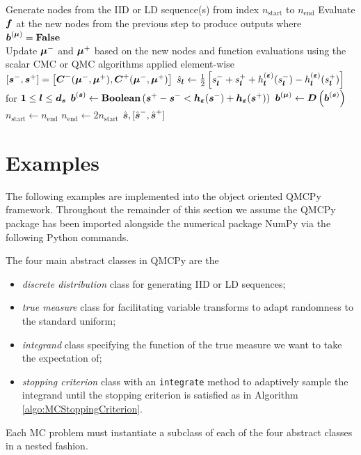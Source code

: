 \documentclass{article}[12pt]
\begin{document}
\begin{algorithm}[h!]
\begin{algorithmic}
     
        \State Generate nodes from the IID or LD sequence(s) from index $n_\text{start}$ to $n_\text{end}$
        \State Evaluate $\bf$ at the new nodes from the previous step to produce outputs where $\bb^{(\bmu)}=\textbf{\False}$ \\ 
        \State Update $\bmu^-$ and $\bmu^+$ based on the new nodes and function evaluations using the scalar CMC or QMC algorithms applied element-wise 
        \State $[\bs^-,\bs^+] = \left[\bC^-(\bmu^-,\bmu^+),\bC^+(\bmu^-,\bmu^+)\right]$ 
        \State $\hat{s}_{\bl} \gets \frac{1}{2}\left[s_{\bl}^-+s_{\bl}^++h^{(\bvarepsilon)}_{\bl}(s_{\bl}^-)-h^{(\bvarepsilon)}_{\bl}(s_{\bl}^+)\right]$ for $\boldsymbol{1} \leq \bl \leq \bd_{\bs}$ 
        \State $\bb^{(\bs)} \gets \textbf{Boolean}\left(\bs^+-\bs^- < \bh_{\bvarepsilon}(\bs^-)+\bh_{\bvarepsilon}(\bs^+)\right)$ 
        \State $\bb^{(\bmu)} \gets \bD\left(\bb^{(\bs)}\right)$
        \State $n_\text{start} \gets n_\text{end}$
        \State $n_\text{end} \gets 2n_\text{start}$
    \EndWhile
    \State \Return $\hat{\bs},[\hat{\bs}^-,\hat{\bs}^+]$
    \end{algorithmic}
\end{algorithm}

\section{Examples} \label{sec:examples}

The following examples are implemented into the object oriented QMCPy framework. Throughout the remainder of this section we assume the QMCPy package \cite{QMCPy} has been imported alongside the numerical package NumPy \cite{numpy} via the following Python commands. 

The four main abstract classes in QMCPy are the 
\begin{itemize}
    \item \emph{discrete distribution} class for generating IID or LD sequences;
    \item \emph{true measure} class for facilitating variable transforms to adapt randomness to the standard uniform;
    \item \emph{integrand} class specifying the function of the true measure we want to take the expectation of; 
    \item \emph{stopping criterion} class with an \texttt{integrate} method to adaptively sample the integrand until the stopping criterion is satisfied as in Algorithm \ref{algo:MCStoppingCriterion}.
\end{itemize}
Each MC problem must instantiate a subclass of each of the four abstract classes in a nested fashion. 
\end{document}
